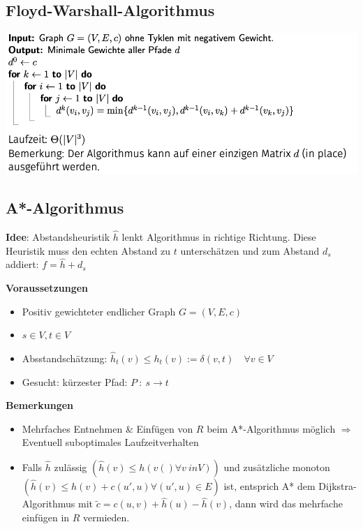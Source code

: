 \vspace{-4pt}
\begin{sectionbox}
\subsection{Floyd-Warshall-Algorithmus}
\begin{center}
    \includegraphics[width=\columnwidth]{img/FloydWarshall.png}
\end{center}
\end{sectionbox}
\vspace{-4pt}
\begin{sectionbox}
\subsection{A*-Algorithmus}
\textbf{Idee}: Abstandsheuristik $\hat{h}$ lenkt Algorithmus in richtige Richtung. Diese Heuristik muss den echten Abstand zu $t$ unterschätzen und zum
Abstand $d_s$ addiert: $f = \hat{h} + d_s$


\textbf{Voraussetzungen}
\begin{itemize}
    \item Positiv gewichteter endlicher Graph $G = (V, E, c)$
    \item $s \in V, t \in V$
    \item Absstandschätzung: $\hat{h}_t(v) \leq h_t(v) := \delta(v,t) \quad \forall v \in V$
    \item Gesucht: kürzester Pfad: $P \: : \: s \rightarrow t$
\end{itemize}

\textbf{Bemerkungen}
\begin{itemize}
    \item Mehrfaches Entnehmen \& Einfügen von $R$ beim A*-Algorithmus möglich $\Rightarrow$ Eventuell suboptimales Laufzeitverhalten
    \item Falls $\hat{h}$ zulässig $\left( \hat{h}(v) \leq h(v() \forall v \ in V)\right)$ und zusätzliche monoton $\left( \hat{h}(v) \leq h(v) + c(u',u) \forall (u',u) \in E \right)$ ist, entsprich A* dem Dijkstra-Algorithmus mit $\tilde{c} = c(u,v) + \hat{h}(u) - \hat{h}(v)$, dann wird das mehrfache einfügen in $R$ vermieden.
\end{itemize}
\end{sectionbox}
